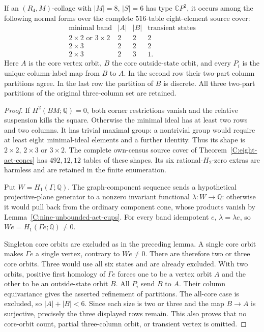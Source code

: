 \begin{lemma}
\label{C:eight-R4-six-core-normalforms}
If an $(R_4,M)$-collage with $|M|=8$, $|S|=6$ has type
$\mathbb CP^2$, it occurs among the following normal forms
over the complete $516$-table eight-element source cover:
\[
\begin{array}{c|c|c|c}
\text{minimal band}&|A|&|B|&\text{transient states}\\\hline
2\times2\text{ or }3\times2&2&2&2\\
2\times3&2&2&2\\
2\times3&2&3&1.
\end{array}
\]
Here $A$ is the core vertex orbit, $B$ the core outside-state
orbit, and every $P_i$ is the unique column-label map from
$B$ to $A$.  In the second row their two-part column
partitions agree.  In the last row the partition of $B$
is discrete.  All three two-part partitions of the original
three-column set are retained.
\end{lemma}
\begin{proof}
If $H^2(BM;\mathbb Q)=0$, both corner restrictions vanish
and the relative suspension kills the square.  Otherwise
the minimal ideal has at least two rows and two columns.
It has trivial maximal group: a nontrivial group would
require at least eight minimal-ideal elements and a
further identity.  Thus its shape is $2\times2$, $2\times3$
or $3\times2$.  The complete own-census source cover of
Theorem~\ref{C:eight-act-cones} has $492,12,12$ tables of
these shapes.  Its six rational-$H_2$-zero extras are
harmless and are retained in the finite enumeration.

Put $W=H_1(\Gamma;\mathbb Q)$.  The graph-component
sequence sends a hypothetical projective-plane generator
to a nonzero invariant functional $\lambda:W\to\mathbb Q$:
otherwise it would pull back from the ordinary component
cone, whose products vanish by
Lemma~\ref{C:nine-unbounded-act-cups}.  For every band
idempotent $e$, $\lambda=\lambda e$, so
$We=H_1(\Gamma e;\mathbb Q)\ne0$.

Singleton core orbits are excluded as in the preceding
lemma.  A single core orbit makes $\Gamma e$ a single
vertex, contrary to $We\ne0$.  There are therefore two
or three core orbits.
Three would use all six states and are already excluded.
With two orbits, positive first homology of $\Gamma e$
forces one to be a vertex orbit $A$ and the other to be
an outside-state orbit $B$.  All $P_i$ send $B$ to $A$.
Their column equivariance gives the asserted refinement
of partitions.  The all-core case is excluded, so
$|A|+|B|<6$.  Since each size is two or three and the
map $B\to A$ is surjective, precisely the three displayed
rows remain.  This also proves that no core-orbit count,
partial three-column orbit, or transient vertex is omitted.
\end{proof}

